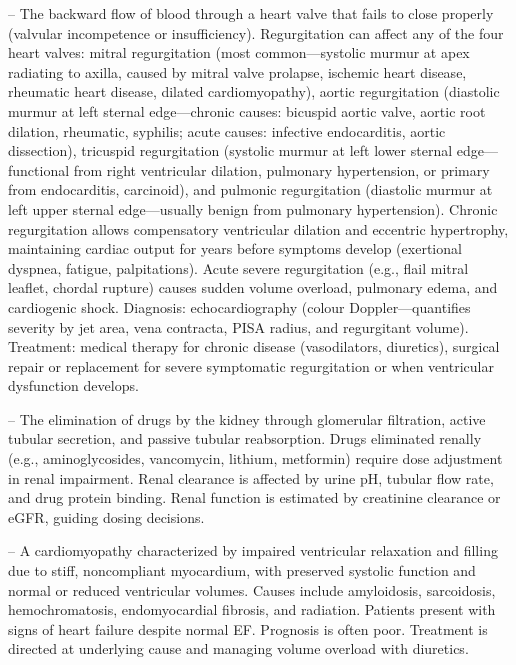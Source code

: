 -- The backward flow of blood through a heart valve that fails to close properly (valvular incompetence or insufficiency). Regurgitation can affect any of the four heart valves: mitral regurgitation (most common—systolic murmur at apex radiating to axilla, caused by mitral valve prolapse, ischemic heart disease, rheumatic heart disease, dilated cardiomyopathy), aortic regurgitation (diastolic murmur at left sternal edge—chronic causes: bicuspid aortic valve, aortic root dilation, rheumatic, syphilis; acute causes: infective endocarditis, aortic dissection), tricuspid regurgitation (systolic murmur at left lower sternal edge—functional from right ventricular dilation, pulmonary hypertension, or primary from endocarditis, carcinoid), and pulmonic regurgitation (diastolic murmur at left upper sternal edge—usually benign from pulmonary hypertension). Chronic regurgitation allows compensatory ventricular dilation and eccentric hypertrophy, maintaining cardiac output for years before symptoms develop (exertional dyspnea, fatigue, palpitations). Acute severe regurgitation (e.g., flail mitral leaflet, chordal rupture) causes sudden volume overload, pulmonary edema, and cardiogenic shock. Diagnosis: echocardiography (colour Doppler—quantifies severity by jet area, vena contracta, PISA radius, and regurgitant volume). Treatment: medical therapy for chronic disease (vasodilators, diuretics), surgical repair or replacement for severe symptomatic regurgitation or when ventricular dysfunction develops.

-- The elimination of drugs by the kidney through glomerular filtration, active tubular secretion, and passive tubular reabsorption. Drugs eliminated renally (e.g., aminoglycosides, vancomycin, lithium, metformin) require dose adjustment in renal impairment. Renal clearance is affected by urine pH, tubular flow rate, and drug protein binding. Renal function is estimated by creatinine clearance or eGFR, guiding dosing decisions.

-- A cardiomyopathy characterized by impaired ventricular relaxation and filling due to stiff, noncompliant myocardium, with preserved systolic function and normal or reduced ventricular volumes. Causes include amyloidosis, sarcoidosis, hemochromatosis, endomyocardial fibrosis, and radiation. Patients present with signs of heart failure despite normal EF. Prognosis is often poor. Treatment is directed at underlying cause and managing volume overload with diuretics.


